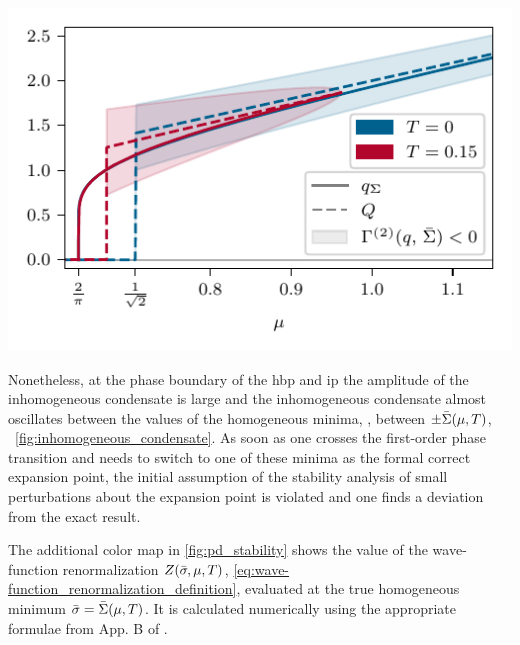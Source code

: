 	{%
		\vspace{.44cm}
		\includegraphics[width=\subcaptionFigureWidth]{gn/figures/q_stab_vs_min.pdf} %
		\captionsetup{width=\subcaptionFigureWidth}%
		\caption{%
			The minimum of the bosonic two-point function $\qmin ( \mu )$ and the dominating wave vector of the true inhomogeneous condensate $\qs ( \mu )$ as a function of the chemical potential at constant temperatures $T/\snull \in \{ 0.0, 0.15 \}$.
				The colored regions mark the range of momenta $q$, where $\gtwovar{\sminhom ( \mu, T )}{\mu}{T}{q} < 0$.
		}%
		\label{fig:stability_wavevector_vs_condensate_wavevector_mu_scan}
	}%
Nonetheless, at the phase boundary of the \gls{hbp} and \gls{ip} the amplitude of the inhomogeneous condensate is large and the inhomogeneous condensate almost oscillates between the values of the homogeneous minima, \ie{}, between $\pm \bar{\Sigma}(\mu, T)$, \cf{}\ \cref{fig:inhomogeneous_condensate}.
As soon as one crosses the first-order phase transition and needs to switch to one of these minima as the formal correct expansion point, the initial assumption of the stability analysis of small perturbations about the expansion point is violated and one finds a deviation from the exact result.

The additional color map in \cref{fig:pd_stability} shows the value of the wave-function renormalization $Z ( \bar{\sigma}, \mu, T )$, \cref{eq:wave-function_renormalization_definition}, evaluated at the true homogeneous minimum ${\bar{\sigma} = \bar{\Sigma} ( \mu, T )}$.
It is calculated numerically using the appropriate formulae from App. B of .

